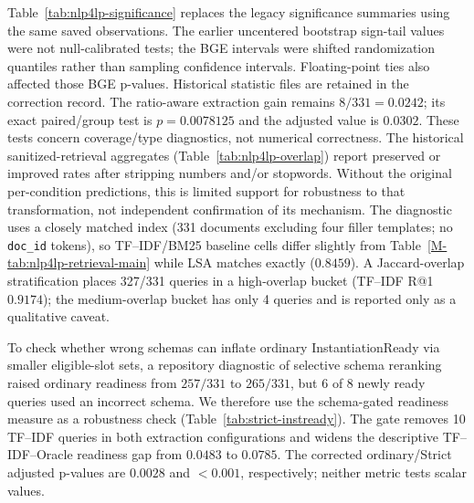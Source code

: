 Table~\ref{tab:nlp4lp-significance} replaces the legacy significance summaries using the same saved observations. The earlier uncentered bootstrap sign-tail values were not null-calibrated tests; the BGE intervals were shifted randomization quantiles rather than sampling confidence intervals. Floating-point ties also affected those BGE p-values. Historical statistic files are retained in the correction record. The ratio-aware extraction gain remains $8/331=0.0242$; its exact paired/group test is $p=0.0078125$ and the adjusted value is $0.0302$. These tests concern coverage/type diagnostics, not numerical correctness.
The historical sanitized-retrieval aggregates (Table~\ref{tab:nlp4lp-overlap}) report preserved or improved rates after stripping numbers and/or stopwords. Without the original per-condition predictions, this is limited support for robustness to that transformation, not independent confirmation of its mechanism. The diagnostic uses a closely matched index (331 documents excluding four filler templates; no \texttt{doc\_id} tokens), so TF--IDF/BM25 baseline cells differ slightly from Table~\ref{M-tab:nlp4lp-retrieval-main} while LSA matches exactly ($0.8459$). A Jaccard-overlap stratification places 327/331 queries in a high-overlap bucket (TF--IDF R@1 $0.9174$); the medium-overlap bucket has only 4 queries and is reported only as a qualitative caveat.

To check whether wrong schemas can inflate ordinary InstantiationReady via smaller eligible-slot sets, a repository diagnostic of selective schema reranking raised ordinary readiness from $257/331$ to $265/331$, but $6$ of $8$ newly ready queries used an incorrect schema. We therefore use the schema-gated readiness measure as a robustness check (Table~\ref{tab:strict-instready}). The gate removes 10 TF--IDF queries in both extraction configurations and widens the descriptive TF--IDF--Oracle readiness gap from $0.0483$ to $0.0785$. The corrected ordinary/Strict adjusted p-values are $0.0028$ and $<0.001$, respectively; neither metric tests scalar values.
